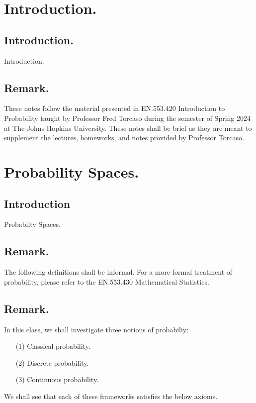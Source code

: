\documentclass[titlepage]{article}
\begin{document}
\maketitle

\tableofcontents

\newpage \section{Introduction.}

\subsection{Introduction.} Introduction.

\subsection{Remark.} These notes follow the material presented in EN.553.420 Introduction to Probability taught by Professor Fred Torcaso during the semester of Spring 2024 at The Johns Hopkins University. These notes shall be brief as they are meant to supplement the lectures, homeworks, and notes provided by Professor Torcaso.

\newpage \section{Probability Spaces.}

\subsection{Introduction} Probabilty Spaces.

\subsection{Remark.} The following definitions shall be informal. For a more formal treatment of probability, please refer to the EN.553.430 Mathematical Statistics.

\subsection{Remark.} In this class, we shall investigate three notions of probabiliy:
\begin{enumerate}
\item[(1)] Classical probability.
\item[(2)] Discrete probability.
\item[(3)] Continuous probability.
\end{enumerate}
We shall see that each of these frameworks satisfies the below axioms.
\end{document}
